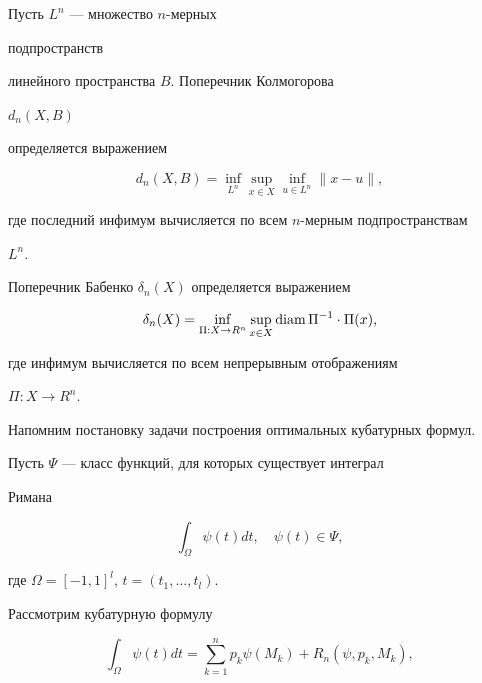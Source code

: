 \begin{defns}[\myfont{[5]}] Пусть $L^{n}$ --- множество $n$-мерных


подпространств


линейного пространства $B$. Поперечник Колмогорова


$d_n(X,B)$


определяется выражением


$$


d_{n}(X,B)=\inf_{L^n}\sup_{x\in X}\inf_{u\in{L^n}}\|x-u\|,


$$


где последний инфимум вычисляется по всем $n$-мерным подпространствам


$L^n$.


\end{defns}





\begin{defns}[\myfont{[5]}] Поперечник Бабенко $\delta_n(X)$ определяется выражением


$$


\delta_n(X)=\inf_{\Pi:X\to R^n}\sup_{x\in X} \diam \Pi^{-1}\cdot


\Pi(x),


$$


где инфимум вычисляется по всем непрерывным отображениям


$\Pi:X\to R^n$.


\end{defns}





Напомним постановку задачи построения оптимальных кубатурных формул.


Пусть $\Psi $ --- класс функций, для которых существует интеграл


Римана


$$


\int_\Omega \psi(t) dt,\quad \psi(t)\in\Psi,


$$


где $\Omega =[-1,1]^l$, $t=(t_1,\dotsc,t_l).$


Рассмотрим кубатурную формулу


\begin{equation}


\int_\Omega \psi(t)dt=\sum_{k=1}^np_k\psi(M_k)+R_n(\psi,p_k,M_k),


\end{equation}



